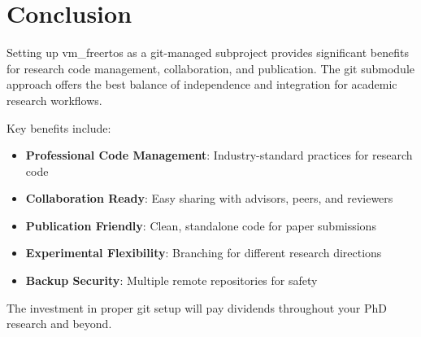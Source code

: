 \documentclass[11pt,a4paper]{article}
\begin{document}
\section{Conclusion}

Setting up vm\_freertos as a git-managed subproject provides significant benefits for research code management, collaboration, and publication. The git submodule approach offers the best balance of independence and integration for academic research workflows.

Key benefits include:
\begin{itemize}
\item \textbf{Professional Code Management}: Industry-standard practices for research code
\item \textbf{Collaboration Ready}: Easy sharing with advisors, peers, and reviewers
\item \textbf{Publication Friendly}: Clean, standalone code for paper submissions
\item \textbf{Experimental Flexibility}: Branching for different research directions
\item \textbf{Backup Security}: Multiple remote repositories for safety
\end{itemize}

The investment in proper git setup will pay dividends throughout your PhD research and beyond.
\end{document}
